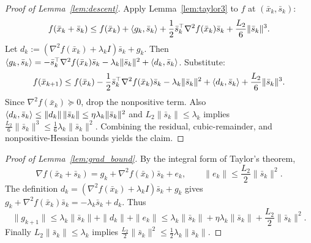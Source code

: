 \documentclass[review,onefignum,onetabnum]{siamart171218}
\begin{document}
	\begin{proof}[Proof of Lemma~\ref{lem:descent}]
		Apply Lemma~\ref{lem:taylor3} to $f$ at $(\bar x_k,\bar s_k)$:
		\[
		f(\bar x_k+\bar s_k)\le f(\bar x_k)+\left\langle g_k,\bar s_k\right\rangle+\frac12\bar s_k^\top\nabla^2 f(\bar x_k)\bar s_k+\frac{L_2}{6}\|\bar s_k\|^3.
		\]
		Let $d_k:=(\nabla^2 f(\bar x_k)+\lambda_k I)\bar s_k+g_k$.
		Then $\left\langle g_k,\bar s_k\right\rangle=-\bar s_k^\top\nabla^2 f(\bar x_k)\bar s_k-\lambda_k\|\bar s_k\|^2+\left\langle d_k,\bar s_k\right\rangle$.
		Substitute:
		\[
		f(\bar x_{k+1})\le f(\bar x_k)-\frac12\bar s_k^\top\nabla^2 f(\bar x_k)\bar s_k-\lambda_k\|\bar s_k\|^2+\left\langle d_k,\bar s_k\right\rangle+\frac{L_2}{6}\|\bar s_k\|^3.
		\]
		Since $\nabla^2 f(\bar x_k)\succeq 0$, drop the nonpositive term. Also
		$\left\langle d_k,\bar s_k\right\rangle\le \|d_k\|\,\|\bar s_k\|\le \eta\lambda_k\|\bar s_k\|^2$
		and $L_2\|\bar s_k\|\le \lambda_k$ implies $\frac{L_2}{6}\|\bar s_k\|^3\le \frac16\lambda_k\|\bar s_k\|^2$.
		Combining the residual, cubic-remainder, and nonpositive-Hessian
		bounds yields the claim.
	\end{proof}
	
	\begin{proof}[Proof of Lemma~\ref{lem:grad_bound}]
		By the integral form of Taylor's theorem,
		\[
		\nabla f(\bar x_k+\bar s_k)=g_k+\nabla^2 f(\bar x_k)\bar s_k+e_k,
		\qquad \|e_k\|\le \frac{L_2}{2}\|\bar s_k\|^2.
		\]
		The definition $d_k=(\nabla^2 f(\bar x_k)+\lambda_k I)\bar s_k+g_k$ gives
		$g_k+\nabla^2 f(\bar x_k)\bar s_k=-\lambda_k\bar s_k+d_k$.
		Thus
		\[
		\|g_{k+1}\|\le \lambda_k\|\bar s_k\|+\|d_k\|+\|e_k\|
		\le \lambda_k\|\bar s_k\|+\eta\lambda_k\|\bar s_k\|+\frac{L_2}{2}\|\bar s_k\|^2.
		\]
		Finally $L_2\|\bar s_k\|\le \lambda_k$ implies $\frac{L_2}{2}\|\bar s_k\|^2\le \frac12\lambda_k\|\bar s_k\|$.
	\end{proof}
	
\end{document}
